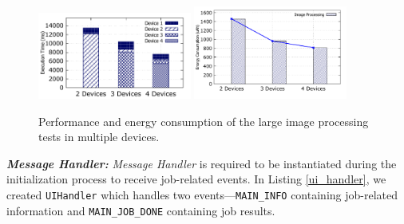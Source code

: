 \documentclass{sig-alternate}
\begin{document}

\begin{figure} [!tbh]
\noindent {}	
  \label{code:get_single_part}
\end{figure}



\begin{figure} 
	\centering
		\includegraphics[width=0.45\textwidth]{data/img_perf.pdf}		
		\includegraphics[width=0.45\textwidth]{data/img_energy.pdf}
	\caption{Performance and energy consumption of the large image processing tests in multiple devices.}
	\label{fig:cluster_performance}
\end{figure}

\textbf{\emph{Message Handler:}} \emph{Message Handler} is required to be instantiated during the initialization process to receive job-related events. In Listing \ref{ui_handler}, we created \texttt{UIHandler} which handles two events---\texttt{MAIN\_INFO} containing job-related information and \texttt{MAIN\_JOB\_DONE} containing job results. 
\end{document}
